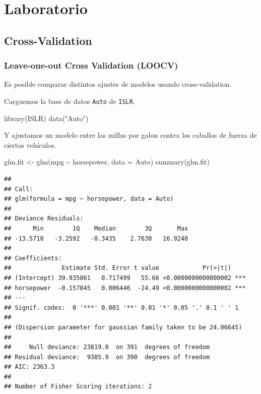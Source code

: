 \documentclass[
  12pt,
]{book}
\newenvironment{Shaded}{\begin{snugshade}}{\end{snugshade}}
\newcommand{\AttributeTok}[1]{\textcolor[rgb]{0.77,0.63,0.00}{#1}}
\newcommand{\FunctionTok}[1]{\textcolor[rgb]{0.00,0.00,0.00}{#1}}
\newcommand{\NormalTok}[1]{#1}
\newcommand{\OtherTok}[1]{\textcolor[rgb]{0.56,0.35,0.01}{#1}}
\newcommand{\SpecialCharTok}[1]{\textcolor[rgb]{0.00,0.00,0.00}{#1}}
\newcommand{\StringTok}[1]{\textcolor[rgb]{0.31,0.60,0.02}{#1}}
\theoremstyle{definition}
\theoremstyle{definition}
\theoremstyle{definition}
\theoremstyle{definition}
\theoremstyle{remark}
\begin{document}
\hypertarget{laboratorio-6}{%
\section{Laboratorio}\label{laboratorio-6}}

\hypertarget{cross-validation}{%
\subsection{Cross-Validation}\label{cross-validation}}

\hypertarget{leave-one-out-cross-validation-loocv}{%
\subsubsection{Leave-one-out Cross Validation (LOOCV)}\label{leave-one-out-cross-validation-loocv}}

Es posible comparar distintos ajustes de modelos usando cross-validation.

Carguemos la base de datos \texttt{Auto} de \texttt{ISLR}.

\begin{Shaded}
\begin{Highlighting}[]
\FunctionTok{library}\NormalTok{(ISLR)}
\FunctionTok{data}\NormalTok{(}\StringTok{"Auto"}\NormalTok{)}
\end{Highlighting}
\end{Shaded}

Y ajustamos un modelo entre las millas por galon contra los caballos de fuerza de ciertos vehículos.

\begin{Shaded}
\begin{Highlighting}[]
\NormalTok{glm.fit }\OtherTok{\textless{}{-}} \FunctionTok{glm}\NormalTok{(mpg }\SpecialCharTok{\textasciitilde{}}\NormalTok{ horsepower, }\AttributeTok{data =}\NormalTok{ Auto)}
\FunctionTok{summary}\NormalTok{(glm.fit)}
\end{Highlighting}
\end{Shaded}

\begin{verbatim}
## 
## Call:
## glm(formula = mpg ~ horsepower, data = Auto)
## 
## Deviance Residuals: 
##      Min        1Q    Median        3Q       Max  
## -13.5710   -3.2592   -0.3435    2.7630   16.9240  
## 
## Coefficients:
##              Estimate Std. Error t value            Pr(>|t|)    
## (Intercept) 39.935861   0.717499   55.66 <0.0000000000000002 ***
## horsepower  -0.157845   0.006446  -24.49 <0.0000000000000002 ***
## ---
## Signif. codes:  0 '***' 0.001 '**' 0.01 '*' 0.05 '.' 0.1 ' ' 1
## 
## (Dispersion parameter for gaussian family taken to be 24.06645)
## 
##     Null deviance: 23819.0  on 391  degrees of freedom
## Residual deviance:  9385.9  on 390  degrees of freedom
## AIC: 2363.3
## 
## Number of Fisher Scoring iterations: 2
\end{verbatim}
\end{document}
